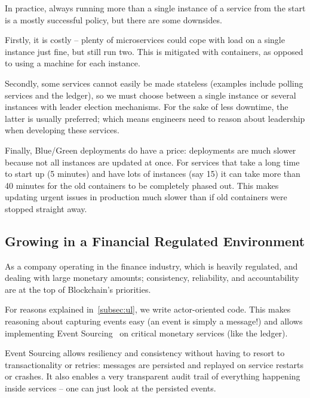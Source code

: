 \documentclass[conference]{IEEEtran}
\begin{document}
    In practice, always running more than a single instance of a service from the start is a mostly
    successful policy, but there are some downsides.

    Firstly, it is costly -- plenty of microservices could cope with load on a single instance just
    fine, but still run two.
    This is mitigated with containers, as opposed to using a machine for each
    instance.

    Secondly, some services cannot easily be made stateless (examples include polling services
    and the ledger), so we must choose between a single instance or several instances with leader
    election mechanisms.
    For the sake of less downtime, the latter is usually preferred;
    which means engineers need to reason about leadership when developing these services.

    Finally, Blue/Green deployments do have a price: deployments are much slower because not
    all instances are updated at once.
    For services that take a long time to start up (5 minutes) and have lots of instances (say 15)
    it can take more than 40 minutes for the old containers to be completely phased out.
    This makes updating urgent issues in production much slower than if old containers were stopped
    straight away.


    \subsection{Growing in a Financial Regulated Environment}\label{subsec:regulated}

    As a company operating in the finance industry, which is heavily regulated, and dealing
    with large monetary amounts;
    consistency, reliability, and accountability are at the top of Blockchain's priorities.

    For reasons explained in~\ref{subsec:ul}, we write actor-oriented code.
    This makes reasoning about capturing events easy (an event is simply a message!) and allows
    implementing Event Sourcing~\cite{fowlerES} on critical monetary services (like the ledger).

    Event Sourcing allows resiliency and consistency without having to resort to transactionality
    or retries: messages are persisted and replayed on service restarts or crashes.
    It also enables a very transparent audit trail of everything happening inside services -- one
    can just look at the persisted events.\\
\end{document}
